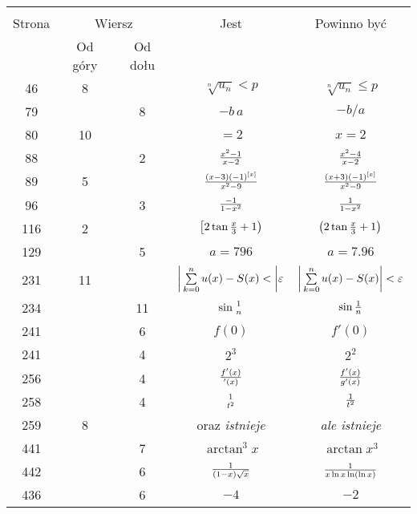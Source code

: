 \documentclass[a4paper,11pt]{article}
\begin{document}
\begin{center}
  \begin{tabular}{|c|c|c|c|c|}
    \hline
    & \multicolumn{2}{c|}{} & & \\
    Strona & \multicolumn{2}{c|}{Wiersz} & Jest
                              & Powinno być \\ \cline{2-3}
    & Od góry & Od dołu & & \\
    \hline
    46  &  8 & & $\sqrt[n]{ u_{ n } } < p$ & $\sqrt[n]{ u_{ n } } \leq p$ \\
    79  & &  8 & $-b \, a$ & $-b / a$ \\
    80  & 10 & & $= 2$ & $x = 2$ \\
    88  & &  2 & $\frac{ x^{ 2 } - 1 }{ x - 2 }$ & $\frac{ x^{ 2 } - 4 }
                                                 { x - 2 }$ \\
    89  &  5 & & $\frac{ ( x - 3 )( -1 )^{ [ x ] } }{ x^{ 2 } - 9 }$
           & $\frac{ ( x + 3 )( -1 )^{ [ x ] } }{ x^{ 2 } - 9 }$ \\
    96  & &  3 & $\frac{ -1 }{ 1 - x^{ 2 } }$
           & $\frac{ 1 }{ 1 - x^{ 2 } }$ \\
    116 &  2 & & $\left[ 2 \tan \frac{ x }{ 3 } + 1 \right)$
           & $ \left( 2 \tan \frac{ x }{ 3 } + 1 \right)$ \\
    129 & &  5 & $a = 796$ & $a = 7.96$ \\
    231 & 11 & & $\bigg| \sum\limits_{ k = 0 }^{ n } u( x ) - S( x ) < \bigg|
                 \varepsilon$
           & $\bigg| \sum\limits_{ k = 0 }^{ n } u( x )
             - S( x ) \bigg| < \varepsilon$ \\
    234 & & 11 & $\sin{ 1 \atop n }$ & $\sin \frac{ 1 }{ n }$ \\
    241 & &  6 & $f( 0 )$ & $f'( 0 )$ \\
    241 & &  4 & $2^{ 3 }$ & $2^{ 2 }$ \\
    256 & &  4 & $\frac{ f'( x ) }{ {}'( x ) }$ & $\frac{ f'( x ) }
                                                { g'( x ) }$ \\
    258 & &  4 & ${ 1 \atop t^{ 2 } }$ & $\frac{ 1 }{ t^{ 2 } }$ \\
    259 &  8 & & oraz \emph{istnieje} & \emph{ale istnieje} \\
    441 & &  7 & $\arctan^{ 3 }x$ & $\arctan x^{ 3 }$ \\
    442 & &  6 & $\frac{ 1 }{ ( 1 - x ) \sqrt{ x } }$
           & $\frac{ 1 }{ x \ln x \ln( \ln x ) }$ \\
    436 & &  6 & $-4$ & $-2$ \\
    \hline
  \end{tabular}
\end{center}
\end{document}
